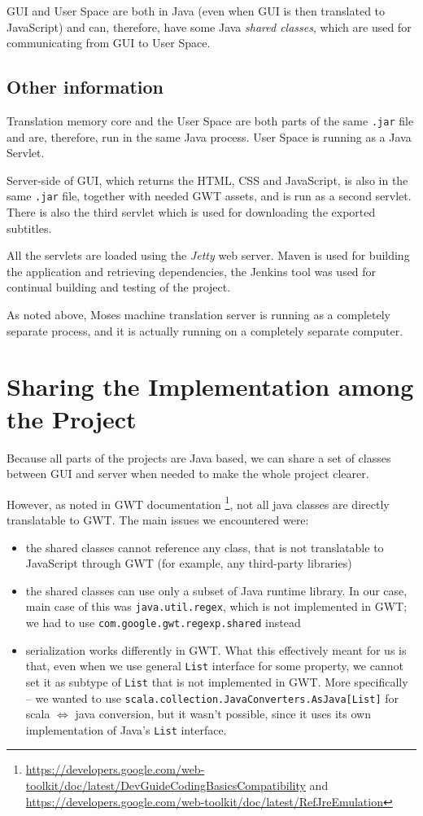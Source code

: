 GUI and User Space are both in Java (even when GUI is then translated to JavaScript) and can, therefore, have some Java \emph{shared classes}, which are used for communicating from GUI to User Space.

\subsection*{Other information}
Translation memory core and the User Space are both parts of the same \texttt{.jar} file and are, therefore, run in the same Java process. User Space is running as a Java Servlet.

Server-side of GUI, which returns the HTML, CSS and JavaScript, is also in the same \texttt{.jar} file, together with needed GWT assets, and is run as a second servlet. There is also the third servlet which is used for downloading the exported subtitles.

All the servlets are loaded using the \emph{Jetty} web server. Maven is used for building the application and retrieving dependencies, the Jenkins tool was used for continual building and testing of the project.

As noted above, Moses machine translation server is running as a completely separate process, and it is actually running on a completely separate computer.


\section{Sharing the Implementation among the Project}

Because all parts of the projects are Java based, we can share a set of classes between GUI and server when needed to make the whole project clearer.

However, as noted in GWT documentation \footnote{\url{https://developers.google.com/web-toolkit/doc/latest/DevGuideCodingBasicsCompatibility} and \url{https://developers.google.com/web-toolkit/doc/latest/RefJreEmulation}}, not all java classes are directly translatable to GWT. The main issues we encountered were:

\begin{itemize}
\item the shared classes cannot reference any class, that is not translatable to JavaScript through GWT (for example, any third-party libraries)
\item the shared classes can use only a subset of Java runtime library. In our case, main case of this was \texttt{java.util.regex}, which is not implemented in GWT; we had to use \texttt{com.google.gwt.regexp.shared} instead
\item serialization works differently in GWT. What this effectively meant for us is that, even when we use general \texttt{List} interface for some property, we cannot set it as subtype of \texttt{List} that is not implemented in GWT. More specifically -- we wanted to use \texttt{scala.collection.JavaConverters.AsJava[List]} for scala $\Leftrightarrow$ java conversion, but it wasn't possible, since it uses its own implementation of Java's \texttt{List} interface.
\end{itemize}

